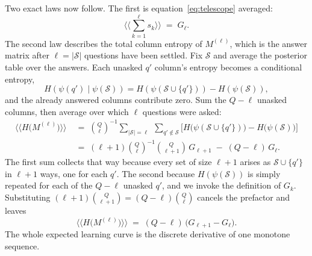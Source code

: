 \documentclass[11pt]{article}
\begin{document}
Two exact laws now follow. The first is
equation~\eqref{eq:telescope} averaged:
\begin{equation}\label{eq:law-received}
  \Big\langle\!\Big\langle \sum_{k=1}^{\ell} s_k \Big\rangle\!\Big\rangle \;=\; G_\ell.
\end{equation}
The second law describes the total column entropy of $M^{(\ell)}$, which is the answer matrix after $\ell = |\mathcal S|$ questions have been settled. 
Fix $\mathcal S$ and average the posterior table over the
answers. Each unasked $q'$ column's entropy becomes a conditional
entropy, 
\begin{equation}
H(\psi(q') \mid \psi(\mathcal S)) = H(\psi(\mathcal S \cup \{q'\})) - H(\psi(\mathcal S)),
\end{equation}
and the already answered columns contribute zero. Sum the $Q-\ell$
unasked columns, then average over which $\ell$ questions were asked:
%
\begin{equation}
\begin{aligned}
  \big\langle\!\big\langle H\big(M^{(\ell)}\big) \big\rangle\!\big\rangle
  &\;=\; \binom{Q}{\ell}^{-1} \sum_{|\mathcal S| = \ell}\;
     \sum_{q' \notin \mathcal S}
     \Big[ H\big(\psi(\mathcal S \cup \{q'\})\big)
           - H\big(\psi(\mathcal S)\big) \Big] \\[2pt]
  &\;=\; 
     (\ell{+}1)\binom{Q}{\ell}^{-1}\binom{Q}{\ell+1}\, G_{\ell+1}
           \;-\; (Q{-}\ell)\, G_\ell .
\end{aligned}
\label{eq:law-remaining-count}
\end{equation}
%
The first sum collects that way because every set of size $\ell + 1$
arises as $\mathcal S \cup \{q'\}$ in $\ell+1$ ways, one for each $q'$.
The second because $H(\psi(\mathcal S))$ is simply repeated for each of
the $Q-\ell$ unasked $q'$, and we invoke the definition of $G_k$. Substituting
$(\ell{+}1)\binom{Q}{\ell+1} = (Q{-}\ell)\binom{Q}{\ell}$ cancels the
prefactor and leaves
\begin{equation}\label{eq:law-remaining}
  \big\langle\!\big\langle H\big(M^{(\ell)}\big) \big\rangle\!\big\rangle
  \;=\; (Q - \ell)\,\big(G_{\ell+1} - G_\ell\big).
\end{equation}
The whole expected learning curve is the discrete derivative of
one monotone sequence.
\end{document}
